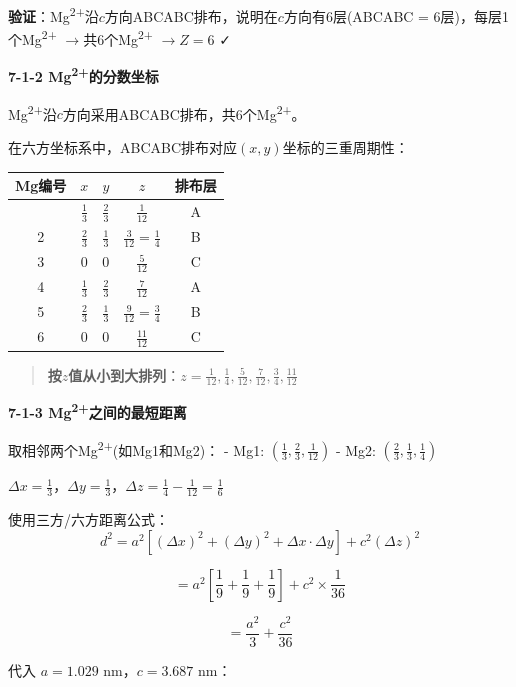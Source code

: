 \documentclass[a4paper,11pt]{ctexart}
\newcounter{none}
\newcommand{\箭}{\ensuremath{\rightarrow}}
\newcommand{\左箭}{\ensuremath{\leftarrow}}
\newcommand{\上箭}{\ensuremath{\uparrow}}
\newcommand{\下箭}{\ensuremath{\downarrow}}
\newcommand{\衡}{\ensuremath{\rightleftharpoons}}
\newcommand{\双箭}{\ensuremath{\leftrightarrow}}
\newcommand{\约等于}{\ensuremath{\approx}}
\newcommand{\小于等于}{\ensuremath{\leq}}
\newcommand{\大于等于}{\ensuremath{\geq}}
\newcommand{\不等于}{\ensuremath{\neq}}
\newcommand{\西格马}{\ensuremath{\sigma}}
\newcommand{\派}{\ensuremath{\pi}}
\begin{document}
\textbf{验证}：Mg\textsuperscript{2+}沿\(c\)方向ABCABC排布，说明在\(c\)方向有6层(ABCABC = 6层)，每层1个Mg\textsuperscript{2+} \箭 共6个Mg\textsuperscript{2+} \箭 \(Z = 6\) ✓

\textbf{7-1-2 Mg\textsuperscript{2+}的分数坐标}

Mg\textsuperscript{2+}沿\(c\)方向采用ABCABC排布，共6个Mg\textsuperscript{2+}。

在六方坐标系中，ABCABC排布对应\((x, y)\)坐标的三重周期性：

{\def\LTcaptype{none} %
\begin{longtable}[]{@{}ccccc@{}}
\toprule\noalign{}
Mg编号 & \(x\) & \(y\) & \(z\) & 排布层 \\
\midrule\noalign{}
\endhead
\bottomrule\noalign{}
\endlastfoot
1 & \(\frac{1}{3}\) & \(\frac{2}{3}\) & \(\frac{1}{12}\) & A \\
2 & \(\frac{2}{3}\) & \(\frac{1}{3}\) & \(\frac{3}{12} = \frac{1}{4}\) & B \\
3 & \(0\) & \(0\) & \(\frac{5}{12}\) & C \\
4 & \(\frac{1}{3}\) & \(\frac{2}{3}\) & \(\frac{7}{12}\) & A \\
5 & \(\frac{2}{3}\) & \(\frac{1}{3}\) & \(\frac{9}{12} = \frac{3}{4}\) & B \\
6 & \(0\) & \(0\) & \(\frac{11}{12}\) & C \\
\end{longtable}
}

\begin{quote}
\textbf{按\(z\)值从小到大排列}：\(z = \frac{1}{12}, \frac{1}{4}, \frac{5}{12}, \frac{7}{12}, \frac{3}{4}, \frac{11}{12}\)
\end{quote}

\textbf{7-1-3 Mg\textsuperscript{2+}之间的最短距离}

取相邻两个Mg\textsuperscript{2+}(如Mg1和Mg2)：
- Mg1: \((\frac{1}{3}, \frac{2}{3}, \frac{1}{12})\)
- Mg2: \((\frac{2}{3}, \frac{1}{3}, \frac{1}{4})\)

\(\Delta x = \frac{1}{3}\)，\(\Delta y = \frac{1}{3}\)，\(\Delta z = \frac{1}{4} - \frac{1}{12} = \frac{1}{6}\)

使用三方/六方距离公式：
\[d^2 = a^2[(\Delta x)^2 + (\Delta y)^2 + \Delta x \cdot \Delta y] + c^2(\Delta z)^2\]

\[= a^2\left[\frac{1}{9} + \frac{1}{9} + \frac{1}{9}\right] + c^2 \times \frac{1}{36}\]

\[= \frac{a^2}{3} + \frac{c^2}{36}\]

代入 \(a = 1.029\) nm，\(c = 3.687\) nm：
\end{document}
